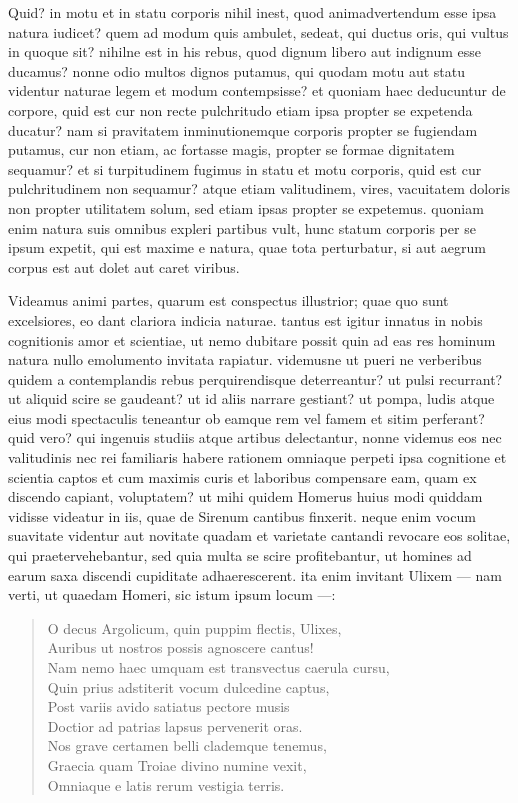 Quid? in motu et in statu corporis nihil inest, quod animadvertendum esse ipsa natura iudicet? quem ad modum quis ambulet, sedeat, qui ductus oris, qui vultus in quoque sit? nihilne est in his rebus, quod dignum libero aut indignum esse ducamus? nonne odio multos dignos putamus, qui quodam motu aut statu videntur naturae legem et modum contempsisse? et quoniam haec deducuntur de corpore, quid est cur non recte pulchritudo etiam ipsa propter se expetenda ducatur? nam si pravitatem inminutionemque corporis propter se fugiendam putamus, cur non etiam, ac fortasse magis, propter se formae dignitatem sequamur? et si turpitudinem fugimus in statu et motu corporis, quid est cur pulchritudinem non sequamur? atque etiam valitudinem, vires, vacuitatem doloris non propter utilitatem solum, sed etiam ipsas propter se expetemus. quoniam enim natura suis omnibus expleri partibus vult, hunc statum corporis per se ipsum expetit, qui est maxime e natura, quae tota perturbatur, si aut aegrum corpus est aut dolet aut caret viribus.

Videamus animi partes, quarum est conspectus illustrior; quae quo sunt excelsiores, eo dant clariora indicia naturae. tantus est igitur innatus in nobis cognitionis amor et scientiae, ut nemo dubitare possit quin ad eas res hominum natura nullo emolumento invitata rapiatur. videmusne ut pueri ne verberibus quidem a contemplandis rebus perquirendisque deterreantur? ut pulsi recurrant? ut aliquid scire se gaudeant? ut id aliis narrare gestiant? ut pompa, ludis atque eius modi spectaculis teneantur ob eamque rem vel famem et sitim perferant? quid vero? qui ingenuis studiis atque artibus delectantur, nonne videmus eos nec valitudinis nec rei familiaris habere rationem omniaque perpeti ipsa cognitione et scientia captos et cum maximis curis et laboribus compensare eam, quam ex discendo capiant, voluptatem?  ut mihi quidem Homerus huius modi quiddam vidisse videatur in iis, quae de Sirenum cantibus finxerit. neque enim vocum suavitate videntur aut novitate quadam et varietate cantandi revocare eos solitae, qui praetervehebantur, sed quia multa se scire profitebantur, ut homines ad earum saxa discendi cupiditate adhaerescerent. ita enim invitant Ulixem — nam verti, ut quaedam Homeri, sic istum ipsum locum —:
\begin{verse}
O decus Argolicum, quin puppim flectis, Ulixes,\\
Auribus ut nostros possis agnoscere cantus!\\
Nam nemo haec umquam est transvectus caerula cursu,\\ 
Quin prius adstiterit vocum dulcedine captus,\\
Post variis avido satiatus pectore musis\\
Doctior ad patrias lapsus pervenerit oras.\\
Nos grave certamen belli clademque tenemus,\\
Graecia quam Troiae divino numine vexit,\\
Omniaque e latis rerum vestigia terris.\\

\end{verse}

